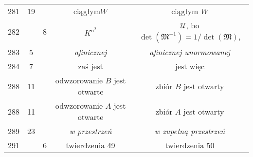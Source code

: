 \documentclass[a4paper,11pt]{article}
\begin{document}
\begin{center}
\begin{tabular}{|c|c|c|c|c|}
    281 & 19 & & ciągłym$W$ & ciągłym $W$ \\
    282 & &  8 & $K^{ n^{ 2 } }$
           & $\mathcal{U}$, bo $\det( \mathfrak{M}^{ -1 } )
             = 1/\det( \mathfrak{M} )$, \\
    283 &  5 & & \emph{afinicznej} & \emph{afinicznej unormowanej} \\
    284 &  7 & & zaś jest & jest więc \\
    288 & 11 & & odwzorowanie $B$ jest otwarte & zbiór $B$ jest otwarty \\
    288 & 11 & & odwzorowanie $A$ jest otwarte & zbiór $A$ jest otwarty \\
    289 & 23 & & \emph{w przestrzeń} & \emph{w zupełną przestrzeń} \\
    291 & &  6 & twierdzenia 49 & twierdzenia 50 \\
    \hline
  \end{tabular}


\end{center}
\end{document}
